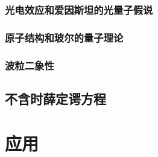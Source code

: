 \documentclass[UTF-8,heading=true,%
	zihao=-4,a4paper]{ctexbook}
\begin{document}
\section{光电效应和爱因斯坦的光量子假说}

\section{原子结构和玻尔的量子理论}

\section{波粒二象性}

\chapter{不含时薛定谔方程}

\part{应\qquad 用}
\end{document}
